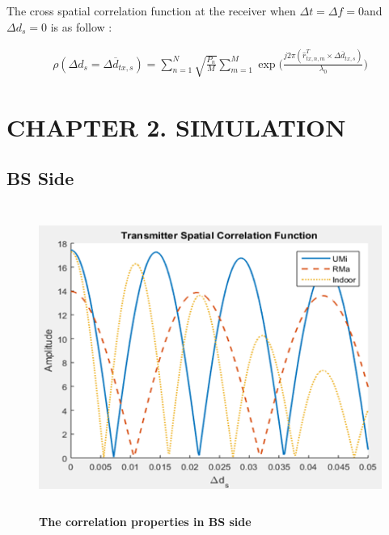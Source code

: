 \documentclass{article} %
\begin{document}
The cross spatial correlation function at the receiver when $\Delta t = \Delta f = 0$and $\Delta d_s = 0$ is as follow \cite{final_exam}:
\begin{adjustwidth}{-2cm}{0cm}
\begin{equation} \label{ptMS}
\begin{split}
    \rho(\Delta d_s = \Delta \overline d_{tx,s}) = \sum_{n=1}^N \sqrt{\frac{P_n}{M}} \sum_{m=1}^M \exp \Big(\frac{j2\pi(\hat{r}_{tx,n,m}^T \times \Delta \overline{d}_{tx,s})}{\lambda_0} \Big)
\end{split}
\end{equation}
\end{adjustwidth}

\section*{CHAPTER 2. SIMULATION}
\setcounter{section}{2}
\setcounter{figure}{0}
\setcounter{table}{0}
\setcounter{subsection}{0}

\subsection{BS Side}

\begin{figure}[!ht]
    \centering
    \includegraphics[height=10cm]{Images/figrue2.png}
    \caption[The correlation properties in BS side~\cite{final_exam}]{\bfseries \fontsize{12pt}{0pt}\selectfont The correlation properties in BS side~\cite{final_exam}}
    \label{figure2}
\end{figure}
\end{document}
